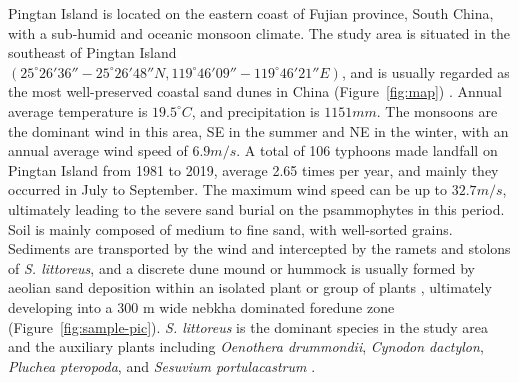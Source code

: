 \documentclass[]{interact}
\theoremstyle{plain}%
\theoremstyle{definition}
\theoremstyle{remark}
\begin{document}
Pingtan Island is located on the eastern coast of Fujian province, South China, with a sub-humid and oceanic monsoon climate. The study area is situated in the southeast of Pingtan Island $(25^{\circ}26'36''-25^{\circ}26'48''N, 119^{\circ}46'09''-119^{\circ}46'21''E)$, and is usually regarded as the most well-preserved coastal sand dunes in China (Figure~\ref{fig:map}) 
\citep{yangDiurnalvariationcharacteristics2017}. 
Annual average temperature is $19.5^{\circ}C$, and precipitation is $1151 mm$. The monsoons are the dominant wind in this area, SE in the summer and NE in the winter, with an annual average wind speed of $6.9 m/s$. A total of 106 typhoons made landfall on Pingtan Island from 1981 to 2019, average 2.65 times per year, and mainly they occurred in July to September. The maximum wind speed can be up to $32.7 m/s$, ultimately leading to the severe sand burial on the psammophytes in this period. Soil is mainly composed of medium to fine sand, with well-sorted grains. Sediments are transported by the wind and intercepted by the ramets and stolons of \textit{S. littoreus}, and a discrete dune mound or hummock is usually formed by aeolian sand deposition within an isolated plant or group of plants \citep{hespCFDFlowDynamics2019}, ultimately developing into a 300 m wide nebkha dominated foredune zone (Figure~\ref{fig:sample-pic}). \textit{S. littoreus} is the dominant species in the study area and the auxiliary plants including \textit{Oenothera drummondii}, \textit{Cynodon dactylon}, \textit{Pluchea pteropoda}, and \textit{Sesuvium portulacastrum} \citep{yangDiurnalvariationcharacteristics2017}. 
\end{document}
